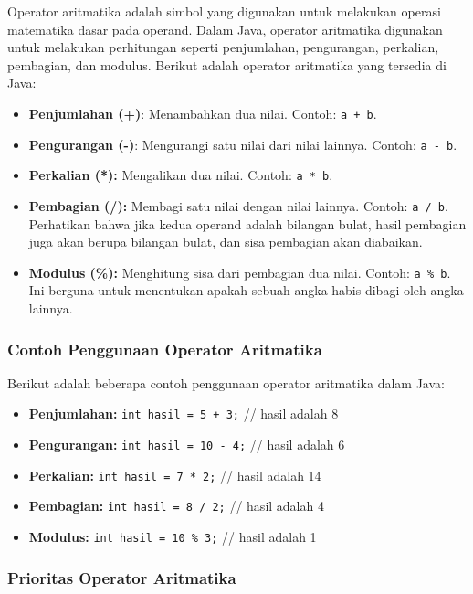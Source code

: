 Operator aritmatika adalah simbol yang digunakan untuk melakukan operasi matematika dasar pada operand. Dalam Java, operator aritmatika digunakan untuk melakukan perhitungan seperti penjumlahan, pengurangan, perkalian, pembagian, dan modulus. Berikut adalah operator aritmatika yang tersedia di Java:

\begin{itemize}
	\item \textbf{Penjumlahan (+)}: Menambahkan dua nilai. Contoh: \texttt{a + b}.
	\item \textbf{Pengurangan (-)}: Mengurangi satu nilai dari nilai lainnya. Contoh: \texttt{a - b}.
	\item \textbf{Perkalian (*):} Mengalikan dua nilai. Contoh: \texttt{a * b}.
	\item \textbf{Pembagian (/):} Membagi satu nilai dengan nilai lainnya. Contoh: \texttt{a / b}. Perhatikan bahwa jika kedua operand adalah bilangan bulat, hasil pembagian juga akan berupa bilangan bulat, dan sisa pembagian akan diabaikan.
	\item \textbf{Modulus (\%):} Menghitung sisa dari pembagian dua nilai. Contoh: \texttt{a \% b}. Ini berguna untuk menentukan apakah sebuah angka habis dibagi oleh angka lainnya.
\end{itemize}

\subsubsection{Contoh Penggunaan Operator Aritmatika}

Berikut adalah beberapa contoh penggunaan operator aritmatika dalam Java:

\begin{itemize}
	\item \textbf{Penjumlahan:} \texttt{int hasil = 5 + 3;} // hasil adalah 8
	\item \textbf{Pengurangan:} \texttt{int hasil = 10 - 4;} // hasil adalah 6
	\item \textbf{Perkalian:} \texttt{int hasil = 7 * 2;} // hasil adalah 14
	\item \textbf{Pembagian:} \texttt{int hasil = 8 / 2;} // hasil adalah 4
	\item \textbf{Modulus:} \texttt{int hasil = 10 \% 3;} // hasil adalah 1
\end{itemize}

\subsubsection{Prioritas Operator Aritmatika}

